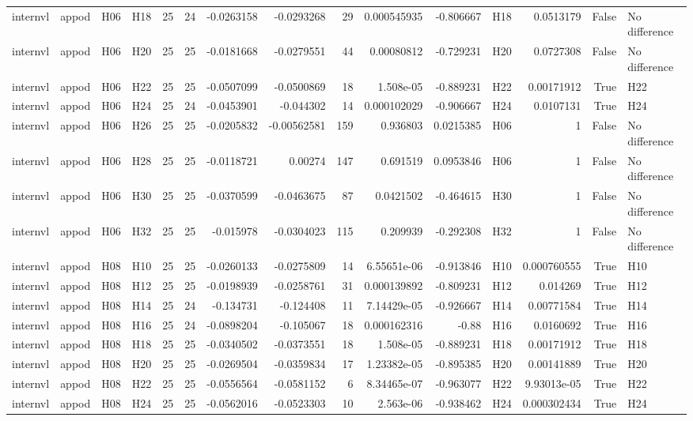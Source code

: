\begin{longtable}{llllrrrrrrrlrrl}
internvl & appod & H06 & H18 & 25 & 24 & -0.0263158 & -0.0293268 & 29 & 0.000545935 & -0.806667 & H18 & 0.0513179 & False & No difference \\
internvl & appod & H06 & H20 & 25 & 25 & -0.0181668 & -0.0279551 & 44 & 0.00080812 & -0.729231 & H20 & 0.0727308 & False & No difference \\
internvl & appod & H06 & H22 & 25 & 25 & -0.0507099 & -0.0500869 & 18 & 1.508e-05 & -0.889231 & H22 & 0.00171912 & True & H22 \\
internvl & appod & H06 & H24 & 25 & 24 & -0.0453901 & -0.044302 & 14 & 0.000102029 & -0.906667 & H24 & 0.0107131 & True & H24 \\
internvl & appod & H06 & H26 & 25 & 25 & -0.0205832 & -0.00562581 & 159 & 0.936803 & 0.0215385 & H06 & 1 & False & No difference \\
internvl & appod & H06 & H28 & 25 & 25 & -0.0118721 & 0.00274 & 147 & 0.691519 & 0.0953846 & H06 & 1 & False & No difference \\
internvl & appod & H06 & H30 & 25 & 25 & -0.0370599 & -0.0463675 & 87 & 0.0421502 & -0.464615 & H30 & 1 & False & No difference \\
internvl & appod & H06 & H32 & 25 & 25 & -0.015978 & -0.0304023 & 115 & 0.209939 & -0.292308 & H32 & 1 & False & No difference \\
internvl & appod & H08 & H10 & 25 & 25 & -0.0260133 & -0.0275809 & 14 & 6.55651e-06 & -0.913846 & H10 & 0.000760555 & True & H10 \\
internvl & appod & H08 & H12 & 25 & 25 & -0.0198939 & -0.0258761 & 31 & 0.000139892 & -0.809231 & H12 & 0.014269 & True & H12 \\
internvl & appod & H08 & H14 & 25 & 24 & -0.134731 & -0.124408 & 11 & 7.14429e-05 & -0.926667 & H14 & 0.00771584 & True & H14 \\
internvl & appod & H08 & H16 & 25 & 24 & -0.0898204 & -0.105067 & 18 & 0.000162316 & -0.88 & H16 & 0.0160692 & True & H16 \\
internvl & appod & H08 & H18 & 25 & 25 & -0.0340502 & -0.0373551 & 18 & 1.508e-05 & -0.889231 & H18 & 0.00171912 & True & H18 \\
internvl & appod & H08 & H20 & 25 & 25 & -0.0269504 & -0.0359834 & 17 & 1.23382e-05 & -0.895385 & H20 & 0.00141889 & True & H20 \\
internvl & appod & H08 & H22 & 25 & 25 & -0.0556564 & -0.0581152 & 6 & 8.34465e-07 & -0.963077 & H22 & 9.93013e-05 & True & H22 \\
internvl & appod & H08 & H24 & 25 & 25 & -0.0562016 & -0.0523303 & 10 & 2.563e-06 & -0.938462 & H24 & 0.000302434 & True & H24 \\

\end{longtable}

